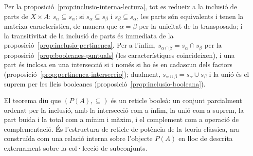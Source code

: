 \begin{prova}
Per la proposició~\ref{prop:inclusio-interna-lectura}, tot es redueix a la
inclusió de parts de \(X\times A\): \(s_\alpha\subseteq s_\alpha\); si
\(s_\alpha\subseteq s_\beta\) i \(s_\beta\subseteq s_\alpha\), les parts
són equivalents i tenen la mateixa característica, de manera que
\(\alpha=\beta\) per la unicitat de la transposada; i la transitivitat de
la inclusió de parts és immediata de la
proposició~\ref{prop:inclusio-pertinenca}. Per a
l'ínfim, \(s_{\alpha\cap\beta}=s_\alpha\cap s_\beta\) per la
proposició~\ref{prop:booleanes-puntuals} (les característiques
coincideixen), i una part és inclosa en una intersecció si i només si ho
és en cadascun dels factors (proposició~\ref{prop:pertinenca-interseccio});
dualment, \(s_{\alpha\cup\beta}=s_\alpha\cup s_\beta\) i la unió és el
suprem per les lleis booleanes (proposició~\ref{prop:inclusio-booleana}).
\end{prova}

\begin{observacio}\label{obs:inclusio-ordre-classica}
El teorema diu que \((P(A),\subseteq)\) és un reticle booleà: un conjunt
parcialment ordenat per la inclusió, amb la intersecció com a ínfim, la
unió com a suprem, la part buida i la total com a mínim i màxim, i el
complement com a operació de complementació. És l'estructura de reticle de
potència de la teoria clàssica, ara construïda com una relació interna
sobre l'objecte \(P(A)\) en lloc de descrita externament sobre la
col·lecció de subconjunts.
\end{observacio}

